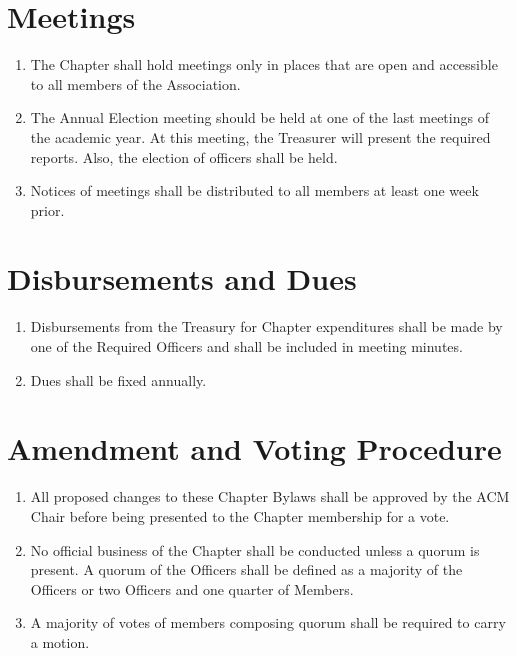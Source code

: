 \section{Meetings}
\begin{enumerate}
	\item The Chapter shall hold meetings only in places that are open and accessible to all members of the Association.
	\item The Annual Election meeting should be held at one of the last meetings of the academic year. At this meeting, the Treasurer will present the required reports. Also, the election of officers shall be held.
	\item Notices of meetings shall be distributed to all members at least one week prior.
\end{enumerate}

\section{Disbursements and Dues}
\begin{enumerate}
	\item Disbursements from the Treasury for Chapter expenditures shall be made by one of the Required Officers and shall be included in meeting minutes.
	\item Dues shall be fixed annually.
\end{enumerate}

\section{Amendment and Voting Procedure}
\begin{enumerate}
	\item All proposed changes to these Chapter Bylaws shall be approved by the ACM Chair before being presented to the Chapter membership for a vote.
	\item No official business of the Chapter shall be conducted unless a quorum is present. A quorum of the Officers shall be defined as a majority of the Officers or two Officers and one quarter of Members.
	\item A majority of votes of members composing quorum shall be required to carry a motion.
\end{enumerate}

